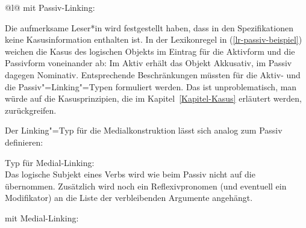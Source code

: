 \ex
\begin{tabular}[t]{@{}l@{}}
 mit Passiv-Linking:\\
\end{tabular}
\zl
Die aufmerksame Leser*in wird festgestellt haben, dass in den Spezifikationen keine
Kasusinformation enthalten ist. In der Lexikonregel in (\ref{lr-passiv-beispiel})
weichen die Kasus des logischen Objekts im Eintrag für die Aktivform und die Passivform
voneinander ab: Im Aktiv erhält das Objekt Akkusativ, im Passiv dagegen Nominativ.
Entsprechende Beschränkungen müssten für die Aktiv- und die Passiv"=Linking"=Typen
formuliert werden. Das ist unproblematisch, man würde auf die Kasusprinzipien,
die im Kapitel~\ref{Kapitel-Kasus} erläutert werden, zurückgreifen.

Der Linking"=Typ für die Medialkonstruktion lässt sich analog zum Passiv definieren:

\eas\label{constr-middle-linking}
Typ für Medial-Linking:\\
\zs
Das logische Subjekt eines Verbs wird wie beim Passiv
nicht auf die \compsl übernommen. Zusätzlich wird noch ein Reflexivpronomen
(und eventuell ein Modifikator) an die Liste der verbleibenden Argumente 
angehängt.

\eas
{} mit Medial-Linking:\\
\zs

